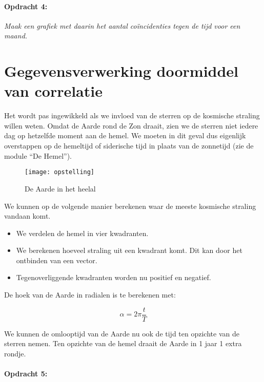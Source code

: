 \paragraph*{Opdracht 4:}

\emph{Maak een grafiek met daarin het aantal coïncidenties tegen de
tijd voor een maand.}


\section{Gegevensverwerking doormiddel van correlatie}

Het wordt pas ingewikkeld als we invloed van de sterren op de kosmische
straling willen weten. Omdat de Aarde rond de Zon draait, zien we
de sterren niet iedere dag op hetzelfde moment aan de hemel. We moeten
in dit geval dus eigenlijk overstappen op de hemeltijd of siderische
tijd in plaats van de zonnetijd (zie de module ``De Hemel'').

\begin{figure}[h]
\noindent \begin{centering}
\texttt{[image: opstelling]}
\par\end{centering}

\caption{De Aarde in het heelal}
\end{figure}


We kunnen op de volgende manier berekenen waar de meeste kosmische
straling vandaan komt.
\begin{itemize}
\item We verdelen de hemel in vier kwadranten.
\item We berekenen hoeveel straling uit een kwadrant komt. Dit kan door
het ontbinden van een vector.
\item Tegenoverliggende kwadranten worden nu positief en negatief.
\end{itemize}
De hoek van de Aarde in radialen is te berekenen met:

\begin{equation}
\alpha=2\pi\frac{t}{T}
\end{equation}


We kunnen de omlooptijd van de Aarde nu ook de tijd ten opzichte van
de sterren nemen. Ten opzichte van de hemel draait de Aarde in 1 jaar
1 extra rondje.


\paragraph*{Opdracht 5:}

